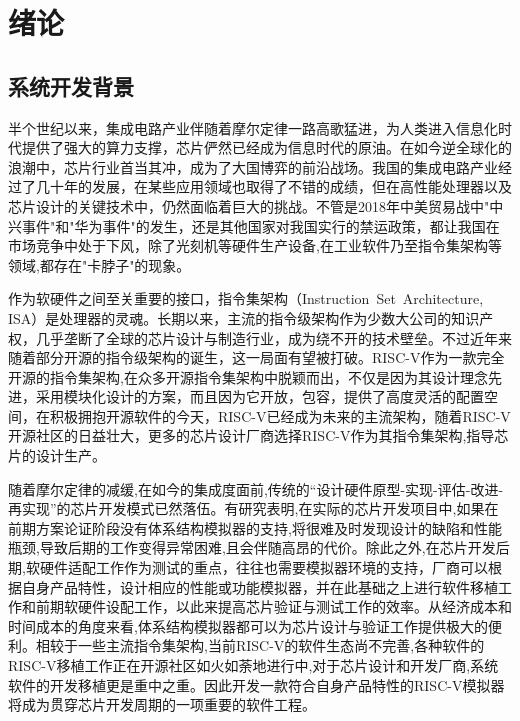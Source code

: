 
\chapter{绪论}

\section{系统开发背景}
半个世纪以来，集成电路产业伴随着摩尔定律一路高歌猛进，为人类进入信息化时代提供了强大的算力支撑，芯片俨然已经成为信息时代的原油。在如今逆全球化的浪潮中，芯片行业首当其冲，成为了大国博弈的前沿战场。我国的集成电路产业经过了几十年的发展，在某些应用领域也取得了不错的成绩，但在高性能处理器以及芯片设计的关键技术中，仍然面临着巨大的挑战\cite{huzhenbo,huzhenbo1}。不管是2018年中美贸易战中"中兴事件"和"华为事件"的发生，还是其他国家对我国实行的禁运政策，都让我国在市场竞争中处于下风，除了光刻机等硬件生产设备,在工业软件乃至指令集架构等领域,都存在"卡脖子"的现象。


作为软硬件之间至关重要的接口，指令集架构（Instruction Set Architecture, ISA）是处理器的灵魂。长期以来，主流的指令级架构作为少数大公司的知识产权，几乎垄断了全球的芯片设计与制造行业，成为绕不开的技术壁垒。不过近年来随着部分开源的指令级架构的诞生，这一局面有望被打破。RISC-V作为一款完全开源的指令集架构,在众多开源指令集架构中脱颖而出，不仅是因为其设计理念先进，采用模块化设计的方案，而且因为它开放，包容，提供了高度灵活的配置空间，在积极拥抱开源软件的今天，RISC-V已经成为未来的主流架构，随着RISC-V开源社区的日益壮大，更多的芯片设计厂商选择RISC-V作为其指令集架构,指导芯片的设计生产\cite{包云岗2022开源芯片生态技术体系构建面临的机遇与挑战}。

随着摩尔定律的减缓,在如今的集成度面前,传统的“设计硬件原型-实现-评估-改进-再实现”的芯片开发模式已然落伍\cite{jichengdu}。有研究表明,在实际的芯片开发项目中,如果在前期方案论证阶段没有体系结构模拟器的支持,将很难及时发现设计的缺陷和性能瓶颈,导致后期的工作变得异常困难,且会伴随高昂的代价\cite{buzhou}。除此之外,在芯片开发后期,软硬件适配工作作为测试的重点\cite{黄聪会2012软件移植理论与技术研究}，往往也需要模拟器环境的支持\cite{butko2012accuracy}，厂商可以根据自身产品特性，设计相应的性能或功能模拟器，并在此基础之上进行软件移植工作和前期软硬件设配工作，以此来提高芯片验证与测试工作的效率。从经济成本和时间成本的角度来看,体系结构模拟器都可以为芯片设计与验证工作提供极大的便利。相较于一些主流指令集架构,当前RISC-V的软件生态尚不完善,各种软件的RISC-V移植工作正在开源社区如火如荼地进行中,对于芯片设计和开发厂商,系统软件的开发移植更是重中之重。因此开发一款符合自身产品特性的RISC-V模拟器将成为贯穿芯片开发周期的一项重要的软件工程。


